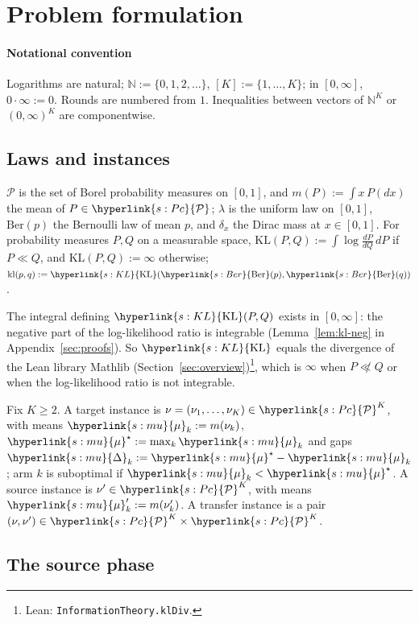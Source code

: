 \documentclass[11pt]{article}
\makeatletter
\newcommand{\dt}[1]{\hypertarget{#1}{}}
\newcommand{\sy}[2]{\hyperlink{#1}{#2}}
\newcommand{\KL}{\sy{s:KL}{\mathrm{KL}}}
\newcommand{\N}{\mathbb{N}}
\newcommand{\Pc}{\sy{s:Pc}{\mathcal{P}}}
\newcommand{\Ber}{\sy{s:Ber}{\mathrm{Ber}}}
\newcommand{\mean}{\sy{s:mu}{\mu}}
\newcommand{\gap}{\sy{s:mu}{\Delta}}
\newcommand{\leanfn}[1]{\ifincognita@blueprint\footnote{Lean: \nolinkurl{#1}.}\fi}
\makeatother
\begin{document}
\section{Problem formulation}\label{sec:setting}

\paragraph{Notational convention} Logarithms are natural; $\N:=\{0,1,2,\dots\}$,
$[K]:=\{1,\dots,K\}$; in $[0,\infty]$, $0\cdot\infty:=0$. Rounds are numbered from $1$. Inequalities
between vectors of $\N^K$ or $(0,\infty)^K$ are componentwise.

\subsection{Laws and instances}

\begin{definition}[{Laws on $[0,1]$}]\label{def:laws}
\dt{s:Pc}$\mathcal P$ is the set of Borel probability measures on $[0,1]$, and $m(P):=\int x\,P(dx)$
the mean of $P\in\Pc$; $\lambda$ is the uniform law on $[0,1]$,
\dt{s:Ber}$\mathrm{Ber}(p)$ the Bernoulli law of mean $p$, and $\delta_x$ the Dirac mass at
$x\in[0,1]$. For probability measures $P,Q$ on a measurable space,
\dt{s:KL}$\mathrm{KL}(P,Q):=\int\log\frac{dP}{dQ}\,dP$ if $P\ll Q$, and $\mathrm{KL}(P,Q):=\infty$
otherwise; \dt{s:kl}$\mathrm{kl}(p,q):=\KL(\Ber(p),\Ber(q))$.
\end{definition}

The integral defining $\KL(P,Q)$ exists in $[0,\infty]$: the negative part of the log-likelihood
ratio is integrable (Lemma~\ref{lem:kl-neg} in Appendix~\ref{sec:proofs}). So $\KL$ equals the
divergence of the Lean library Mathlib (Section~\ref{sec:overview})\leanfn{InformationTheory.klDiv},
which is $\infty$ when $P\not\ll Q$ or when the log-likelihood ratio is not integrable.

\begin{definition}[Instances]\label{def:instance}
Fix $K\ge2$. A target instance is $\nu=(\nu_1,\dots,\nu_K)\in\Pc^K$, with means\dt{s:mu} $\mean_k:=m(\nu_k)$,
$\mean^\star:=\max_k\mean_k$ and gaps $\gap_k:=\mean^\star-\mean_k$; arm $k$ is suboptimal if $\mean_k<\mean^\star$.
A source instance is $\nu'\in\Pc^K$, with means $\mean'_k:=m(\nu'_k)$. A transfer instance is a pair
$(\nu,\nu')\in\Pc^K\times\Pc^K$.
\end{definition}

\subsection{The source phase}\label{sec:setting-source}
\end{document}
